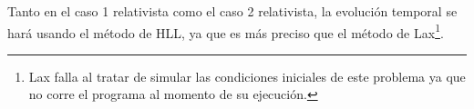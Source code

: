 \documentclass[12pt,a4paper]{book}
\begin{document}
Tanto en el caso 1 relativista como el caso 2 relativista, la evolución temporal se hará usando 
el método de HLL, ya que es más preciso que el método de Lax\footnote{
  Lax falla al tratar de simular las condiciones iniciales de este problema ya que no corre el programa al momento de su ejecución.
}. 

\begin{figure}
  \centering

\end{figure}
\end{document}
